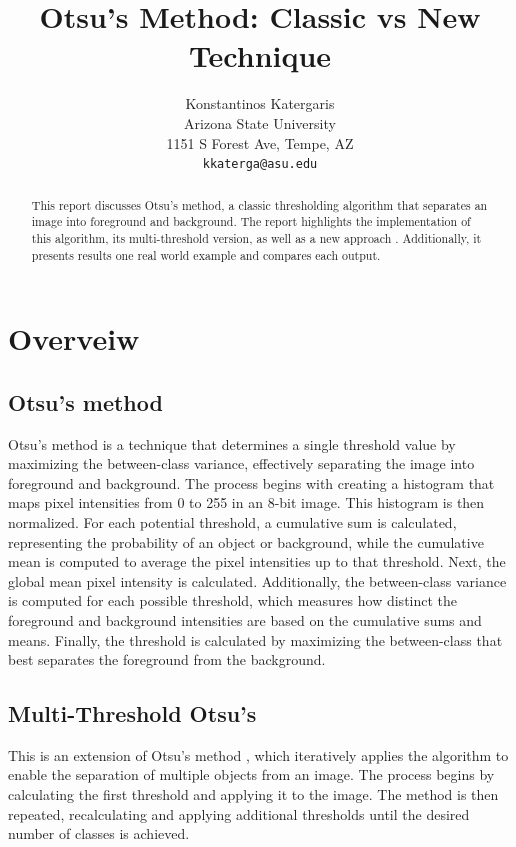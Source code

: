 \documentclass[10pt,twocolumn,letterpaper]{article}
\begin{document}
\title{Otsu's Method: Classic vs New Technique}

\author{Konstantinos Katergaris\\
Arizona State University\\
1151 S Forest Ave, Tempe, AZ\\
{\tt\small kkaterga@asu.edu}}


\maketitle
\begin{abstract}
 This report discusses Otsu's method, a classic thresholding algorithm that separates an image into foreground and background. The report highlights the implementation of this algorithm, its multi-threshold version, as well as a new approach \cite{Huang2014}. Additionally, it presents results one real world example and compares each output.
\end{abstract}
\section{Overveiw}
\subsection{Otsu's method}
Otsu's method\cite{4310076} is a technique that determines a single threshold value by maximizing the between-class variance, effectively separating the image into foreground and background. The process begins with creating a histogram that maps pixel intensities from 0 to 255 in an 8-bit image. This histogram is then normalized. For each potential threshold, a cumulative sum is calculated, representing the probability of an object or background, while the cumulative mean is computed to average the pixel intensities up to that threshold. Next, the global mean pixel intensity is calculated. Additionally, the between-class variance is computed for each possible threshold, which measures how distinct the foreground and background intensities are based on the cumulative sums and means. Finally, the threshold is calculated by maximizing the  between-class that best separates the foreground from the background.
\subsection{ Multi-Threshold Otsu's}
This is an extension of Otsu's method \cite{4310076}, which iteratively applies the algorithm to enable the separation of multiple objects from an image. The process begins by calculating the first threshold and applying it to the image. The method is then repeated, recalculating and applying additional thresholds until the desired number of classes is achieved.
\end{document}
